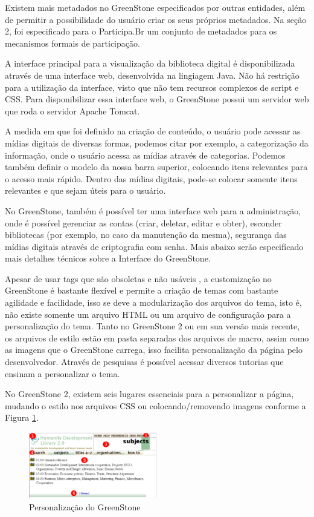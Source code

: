 Existem mais metadados no GreenStone especificados por outras entidades, além de permitir a possibilidade do usuário criar os seus próprios metadados. Na seção 2, foi especificado para o Participa.Br um conjunto de metadados para os mecanismos formais de participação.

A interface principal para a visualização da biblioteca digital é disponibilizada através de uma interface web, desenvolvida na lingiagem Java. Não há restrição para a utilização da interface, visto que não tem recursos complexos de script e CSS. Para disponibilizar essa interface web, o GreenStone possui um servidor web que roda o servidor Apache Tomcat.

A medida em que foi definido na criação de conteúdo, o usuário pode acessar as mídias digitais de diversas formas, podemos citar por exemplo, a categorização da informação, onde o usuário acessa as mídias através de categorias. Podemos também definir o modelo da nossa barra superior, colocando itens relevantes para o acesso mais rápido. Dentro das mídias digitais, pode-se colocar somente itens relevantes e que sejam úteis para o usuário.

No GreenStone, também é possível ter uma interface web para a administração, onde é possível gerenciar as contas (criar, deletar, editar e obter), esconder bibliotecas (por exemplo, no caso da manutenção da mesma), segurança das mídias digitais através de criptografia com senha. Mais abaixo serão especifícado mais detalhes técnicos sobre a Interface do GreenStone.

Apesar de usar tags que são obsoletas e não usáveis , a customização no GreenStone é bastante flexível e permite a criação de temas com bastante agilidade e facilidade, isso se deve a modularização dos arquivos do tema, isto é, não existe somente um arquivo HTML ou um arquivo de configuração para a personalização do tema. Tanto no GreenStone 2 ou em sua versão mais recente, os arquivos de estilo estão em pasta separadas dos arquivos de macro, assim como as imagens que o GreenStone carrega, isso  facilita personalização da página pelo desenvolvedor. Através de pesquisas é possível acessar diversos tutorias que ensinam a personalizar o tema.

No GreenStone 2, existem seis lugares essenciais para a personalizar a página, mudando o estilo nos arquivos CSS ou colocando/removendo imagens conforme a Figura \ref{fig:esqueletogreenstone}.

\graphicspath{{figuras/}}
\begin{figure}[H]
\centering
\includegraphics[width=0.5\textwidth]{esqueleto_greenstone}
\caption{Personalização do GreenStone}
\label{fig:esqueletogreenstone}
\end{figure}


